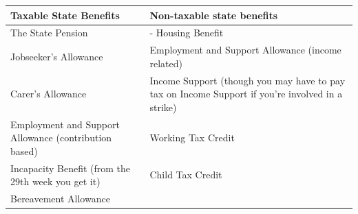 \documentclass[]{tufte-handout}
\begin{document}
\begin{longtable}[]{@{}ll@{}}
\toprule
\begin{minipage}[b]{0.47\columnwidth}\raggedright
Taxable State Benefits\strut
\end{minipage} & \begin{minipage}[b]{0.47\columnwidth}\raggedright
Non-taxable state benefits\strut
\end{minipage}\tabularnewline
\midrule
\endhead
\begin{minipage}[t]{0.47\columnwidth}\raggedright
The State Pension\strut
\end{minipage} & \begin{minipage}[t]{0.47\columnwidth}\raggedright
- Housing Benefit\strut
\end{minipage}\tabularnewline
\begin{minipage}[t]{0.47\columnwidth}\raggedright
Jobseeker's Allowance\strut
\end{minipage} & \begin{minipage}[t]{0.47\columnwidth}\raggedright
Employment and Support Allowance (income related)\strut
\end{minipage}\tabularnewline
\begin{minipage}[t]{0.47\columnwidth}\raggedright
Carer's Allowance\strut
\end{minipage} & \begin{minipage}[t]{0.47\columnwidth}\raggedright
Income Support (though you may have to pay tax on Income Support if
you're involved in a strike)\strut
\end{minipage}\tabularnewline
\begin{minipage}[t]{0.47\columnwidth}\raggedright
Employment and Support Allowance (contribution based)\strut
\end{minipage} & \begin{minipage}[t]{0.47\columnwidth}\raggedright
Working Tax Credit\strut
\end{minipage}\tabularnewline
\begin{minipage}[t]{0.47\columnwidth}\raggedright
Incapacity Benefit (from the 29th week you get it)\strut
\end{minipage} & \begin{minipage}[t]{0.47\columnwidth}\raggedright
Child Tax Credit\strut
\end{minipage}\tabularnewline
\begin{minipage}[t]{0.47\columnwidth}\raggedright
Bereavement Allowance\strut
\end{minipage} & \begin{minipage}[t]{0.47\columnwidth}\raggedright

\end{minipage}
\end{longtable}
\end{document}
